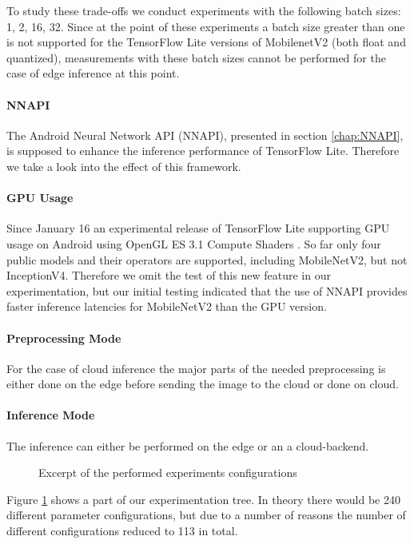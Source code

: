 To study these trade-offs we conduct experiments with the following batch sizes: 1, 2, 16, 32. Since at the point of these experiments a batch size greater than one is not supported for the TensorFlow Lite versions of MobilenetV2 (both float and quantized), measurements with these batch sizes cannot be performed for the case of edge inference at this point.
\paragraph{NNAPI}
The Android Neural Network API (NNAPI), presented in section \ref{chap:NNAPI}, is supposed to enhance the inference performance of TensorFlow Lite. Therefore we take a look into the effect of this framework.
\paragraph{GPU Usage}
Since January 16 an experimental release of TensorFlow Lite supporting GPU usage on Android using OpenGL ES 3.1 Compute Shaders \cite{tfLiteGPU}.
So far only four public models and their operators are supported, including MobileNetV2, but not InceptionV4. 
Therefore we omit the test of this new feature in our experimentation, but our initial testing indicated that the use of NNAPI provides faster inference latencies for MobileNetV2 than the GPU version.
\paragraph{Preprocessing Mode}
For the case of cloud inference the major parts of the needed preprocessing is either done on the edge before sending the image to the cloud or done on cloud.
\paragraph{Inference Mode}
The inference can either be performed on the edge or an a cloud-backend.


\begin{figure}[H]
\centering
 \scalebox{.7}{}

\caption{Excerpt of the performed experiments configurations}
\label{fig:tree}
\end{figure}
Figure \ref{fig:tree} shows a part of our experimentation tree. In theory there would be 240 different parameter configurations, but due to a number of reasons the number of different configurations reduced to 113 in total.

